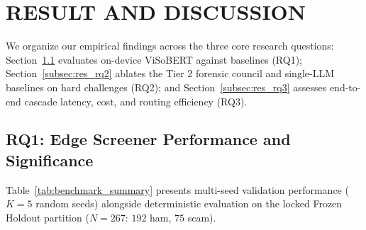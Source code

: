 \section{RESULT AND DISCUSSION}
\label{sec:results}

We organize our empirical findings across the three core research questions: Section~\ref{subsec:res_rq1} evaluates on-device ViSoBERT against baselines (RQ1); Section~\ref{subsec:res_rq2} ablates the Tier 2 forensic council and single-LLM baselines on hard challenges (RQ2); and Section~\ref{subsec:res_rq3} assesses end-to-end cascade latency, cost, and routing efficiency (RQ3).

\subsection{RQ1: Edge Screener Performance and Significance}
\label{subsec:res_rq1}

Table~\ref{tab:benchmark_summary} presents multi-seed validation performance ($K=5$ random seeds) alongside deterministic evaluation on the locked Frozen Holdout partition ($N=267$: $192$ ham, $75$ scam).

